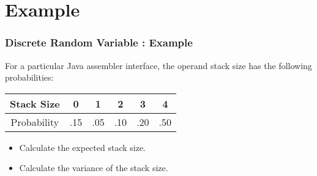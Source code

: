\documentclass[IntroMain.tex]{subfiles}
\begin{document}
\section*{Example}

\begin{frame}
\frametitle{Discrete Random Variable : Example}
\Large
\vspace{-0.5cm}
For a particular Java assembler interface, the operand stack size has the
following probabilities:
\begin{center}
\begin{tabular}{|c||c|c|c|c|c|}
	\hline
	Stack Size  & 0 & 1 & 2 & 3 & 4 \\ \hline
	Probability & .15 & .05 & .10 &.20 &.50\\
	\hline
\end{tabular}
\end{center}


\begin{itemize}

\item Calculate the expected stack size.
\item Calculate the variance of the stack size.

\end{itemize}
\end{frame}
\end{document}

